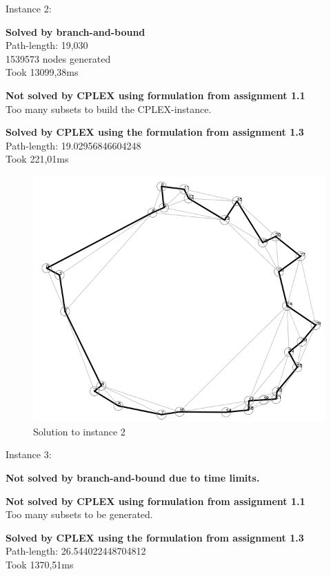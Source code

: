 \noindent Instance 2:

\newpar \textbf{Solved by branch-and-bound}\\
Path-length: 19,030\\
1539573 nodes generated\\
Took 13099,38ms

\newpar \textbf{Not solved by CPLEX using formulation from assignment 1.1}\\
Too many subsets to build the CPLEX-instance.

\newpar \textbf{Solved by CPLEX using the formulation from assignment 1.3}\\
Path-length: 19.02956846604248\\
Took 221,01ms

\begin{figure}[H]
	\includegraphics[width=.9\textwidth]{figures/Instance2Solution.png}
	\caption{Solution to instance 2}
	\label{solution:2}
\end{figure}

\newpar Instance 3:

\newpar \textbf{Not solved by branch-and-bound due to time limits.}

\newpar \textbf{Not solved by CPLEX using formulation from assignment 1.1}\\
Too many subsets to be generated.

\newpar \textbf{Solved by CPLEX using the formulation from assignment 1.3}\\
Path-length: 26.544022448704812\\
Took 1370,51ms

